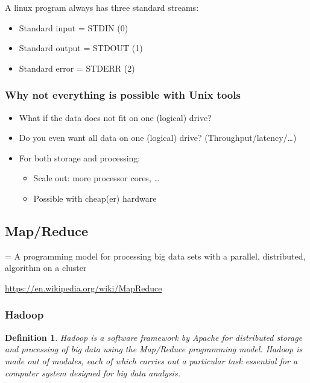 \documentclass{article}
\newtheorem{theorem}{Definition}[section]
\begin{document}
A linux program always has three standard streams:

\begin{itemize}
    \item Standard input = STDIN (0)
    \item Standard output = STDOUT (1)
    \item Standard error = STDERR (2)
\end{itemize}

\subsubsection{Why not everything is possible with Unix tools}

\begin{itemize}
    \item What if the data does not fit on one (logical) drive?
    \item Do you even want all data on one (logical) drive? (Throughput/latency/\dots)
    \item For both storage and processing:
    \begin{itemize}
        \item Scale out: more processor cores, \dots
        \item Possible with cheap(er) hardware
    \end{itemize}
\end{itemize}

\subsection{Map/Reduce}

= A programming model for processing big data sets with a parallel, distributed, algorithm on a cluster

\url{https://en.wikipedia.org/wiki/MapReduce}


\subsubsection{Hadoop}

\begin{theorem}
    Hadoop is a software framework by Apache for distributed storage and processing of big data using the Map/Reduce programming model. 
    Hadoop is made out of modules, each of which carries out a particular task essential for a computer system designed for big data analysis.
\end{theorem}
\end{document}
